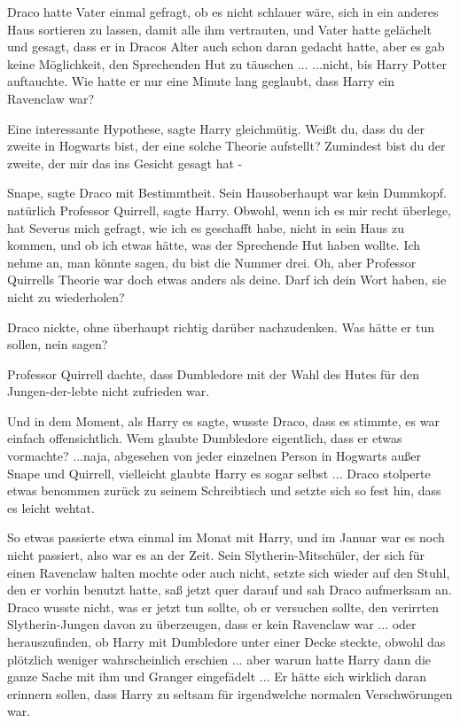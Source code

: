 Draco hatte Vater einmal gefragt, ob es nicht schlauer wäre, sich in ein anderes
Haus sortieren zu lassen, damit alle ihm vertrauten, und Vater hatte gelächelt
und gesagt, dass er in Dracos Alter auch schon daran gedacht hatte, aber es gab
keine Möglichkeit, den Sprechenden Hut zu täuschen ... ...nicht, bis Harry Potter
auftauchte. Wie hatte er nur eine Minute lang geglaubt, dass Harry ein Ravenclaw
war?

\glqq{}Eine interessante Hypothese\grqq{}, sagte Harry gleichmütig. \glqq{}Weißt
du, dass du der zweite in Hogwarts bist, der eine solche Theorie aufstellt?
Zumindest bist du der zweite, der mir das ins Gesicht gesagt hat -\grqq{}

\glqq{}Snape\grqq{}, sagte Draco mit Bestimmtheit. Sein Hausoberhaupt war kein
Dummkopf. \glqq{}natürlich Professor Quirrell\grqq{}, sagte Harry. \glqq{}Obwohl,
wenn ich es mir recht überlege, hat Severus mich gefragt, wie ich es geschafft
habe, nicht in sein Haus zu kommen, und ob ich etwas hätte, was der Sprechende
Hut haben wollte. Ich nehme an, man könnte sagen, du bist die Nummer drei. Oh,
aber Professor Quirrells Theorie war doch etwas anders als deine. Darf ich dein
Wort haben, sie nicht zu wiederholen?\grqq{}

Draco nickte, ohne überhaupt richtig darüber nachzudenken. Was hätte er tun
sollen, nein sagen?

\glqq{}Professor Quirrell dachte, dass Dumbledore mit der Wahl des Hutes für den
Jungen-der-lebte nicht zufrieden war.\grqq{}

Und in dem Moment, als Harry es sagte, wusste Draco, dass es stimmte, es war
einfach offensichtlich. Wem glaubte Dumbledore eigentlich, dass er etwas
vormachte? ...naja, abgesehen von jeder einzelnen Person in Hogwarts außer Snape
und Quirrell, vielleicht glaubte Harry es sogar selbst ... Draco stolperte etwas
benommen zurück zu seinem Schreibtisch und setzte sich so fest hin, dass es
leicht wehtat.

So etwas passierte etwa einmal im Monat mit Harry, und im Januar war es noch
nicht passiert, also war es an der Zeit. Sein Slytherin-Mitschüler, der sich für
einen Ravenclaw halten mochte oder auch nicht, setzte sich wieder auf den Stuhl,
den er vorhin benutzt hatte, saß jetzt quer darauf und sah Draco aufmerksam an.
Draco wusste nicht, was er jetzt tun sollte, ob er versuchen sollte, den
verirrten Slytherin-Jungen davon zu überzeugen, dass er kein Ravenclaw war ...
oder herauszufinden, ob Harry mit Dumbledore unter einer Decke steckte, obwohl
das plötzlich weniger wahrscheinlich erschien ... aber warum hatte Harry dann die
ganze Sache mit ihm und Granger eingefädelt ... Er hätte sich wirklich daran
erinnern sollen, dass Harry zu seltsam für irgendwelche normalen Verschwörungen
war.

